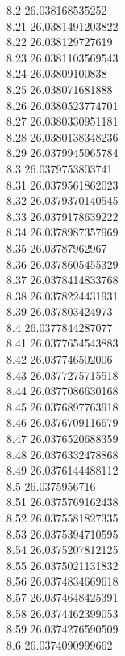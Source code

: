 {8.2	26.038168535252\\
8.21	26.0381491203822\\
8.22	26.038129727619\\
8.23	26.0381103569543\\
8.24	26.03809100838\\
8.25	26.038071681888\\
8.26	26.0380523774701\\
8.27	26.0380330951181\\
8.28	26.0380138348236\\
8.29	26.0379945965784\\
8.3	26.0379753803741\\
8.31	26.0379561862023\\
8.32	26.0379370140545\\
8.33	26.0379178639222\\
8.34	26.0378987357969\\
8.35	26.03787962967\\
8.36	26.0378605455329\\
8.37	26.0378414833768\\
8.38	26.0378224431931\\
8.39	26.037803424973\\
8.4	26.0377844287077\\
8.41	26.0377654543883\\
8.42	26.037746502006\\
8.43	26.0377275715518\\
8.44	26.0377086630168\\
8.45	26.0376897763918\\
8.46	26.0376709116679\\
8.47	26.0376520688359\\
8.48	26.0376332478868\\
8.49	26.0376144488112\\
8.5	26.0375956716\\
8.51	26.0375769162438\\
8.52	26.0375581827335\\
8.53	26.0375394710595\\
8.54	26.0375207812125\\
8.55	26.0375021131832\\
8.56	26.0374834669618\\
8.57	26.0374648425391\\
8.58	26.0374462399053\\
8.59	26.0374276590509\\
8.6	26.0374090999662\\
}
